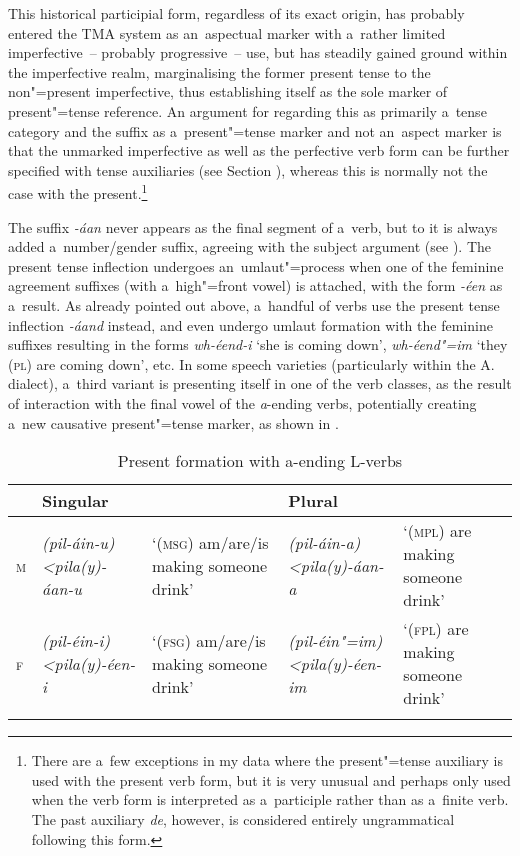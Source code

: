 This historical participial form, regardless of its exact origin, has probably entered the TMA system as an~aspectual marker with a~rather limited imperfective~-- probably progressive~-- use, but has steadily gained ground within the imperfective realm, marginalising the former present tense to the non"=present imperfective, thus establishing itself as the sole marker of present"=tense reference. An argument for regarding this as primarily a~tense category and the suffix as a~present"=tense marker and not an~aspect marker is that the unmarked imperfective as well as the perfective verb form can be further specified with tense auxiliaries (see Section ), whereas this is normally not the case with the present.\footnote{There are a~few exceptions in my data where the present"=tense auxiliary is used with the present verb form, but it is very unusual and perhaps only used when the verb form is interpreted as a~participle rather than as a~finite verb. The past auxiliary \textit{de}, however, is considered entirely ungrammatical following this form.} 


The suffix \textit{-áan} never appears as the final segment of a~verb, but to it is always added a~number/gender suffix, agreeing with the subject argument (see ). The present tense inflection undergoes an~umlaut"=process when one of the feminine agreement suffixes (with a~high"=front vowel) is attached, with the form \textit{-éen} as a~result. As already pointed out above, a~handful of verbs use the present tense inflection \textit{-áand} instead, and even undergo umlaut formation with the feminine suffixes resulting in the forms \textit{wh-éend-i} `she is coming down', \textit{wh-éend"=im} `they (\textsc{pl}) are coming down', etc. In some speech varieties (particularly within the A. dialect), a~third variant is presenting itself in one of the verb classes, as the result of interaction with the final vowel of the \textit{a}-ending verbs, potentially creating a~new causative present"=tense marker, as shown in .


\begin{table}[ht]
\caption{Present formation with a-ending L-verbs}
\begin{tabularx}{\textwidth}{ l P{25mm} Q P{25mm} Q }
\lsptoprule
&
Singular &
&
Plural &
\\\hline
\textsc{m}
&
\textit{(pil-áin-u)}
\textit{{\textless}pila(y)-áan-u} &
`(\textsc{msg}) am/are/is making someone drink' &
\textit{(pil-áin-a)}
\textit{{\textless}pila(y)-áan-a} &
`(\textsc{mpl}) are making someone drink'\\
\textsc{f}
&
\textit{(pil-éin-i)}
\textit{{\textless}pila(y)-éen-i} &
`(\textsc{fsg}) am/are/is making someone drink' &
\textit{(pil-éin"=im)}
\textit{{\textless}pila(y)-éen-im} &
`(\textsc{fpl}) are making someone drink'\\\lspbottomrule
\end{tabularx}
\label{tab:8-25}
\end{table}


